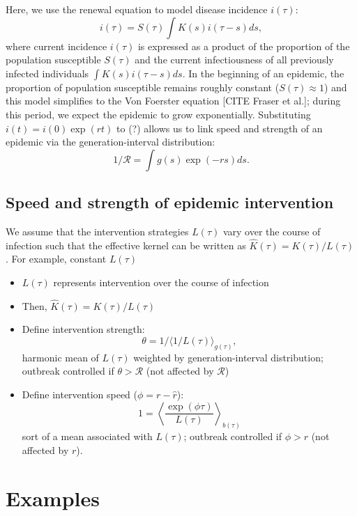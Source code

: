 \documentclass{article}\usepackage[]{graphicx}\usepackage[]{color}
\newcommand{\RR}{\ensuremath{{\mathcal R}}}
\begin{document}
Here, we use the renewal equation to model disease incidence $i(\tau)$:
\begin{equation}
i(\tau) = S(\tau) \int K(s) i(\tau-s) ds,
\end{equation}
where current incidence $i(\tau)$ is expressed as a product of the proportion 
of the population susceptible $S(\tau)$ and the current infectiousness of all 
previously infected individuals $\int K(s) i(\tau - s) ds$. In the beginning 
of an epidemic, the proportion of population susceptible remains roughly 
constant ($S(\tau) \approx 1$) and this model simplifies to the Von Foerster 
equation [CITE Fraser et al.]; during this period, we expect the epidemic 
to grow exponentially. Substituting $i(t) = i(0) \exp(rt)$ to (?) allows us 
to link speed and strength of an epidemic via the generation-interval distribution:
\begin{equation}
1/\RR = \int g(s) \exp(-rs) ds.
\end{equation}

\subsection{Speed and strength of epidemic intervention}

We assume that the intervention strategies $L(\tau)$ vary over the course 
of infection such that the effective kernel can be written as 
$\hat K(\tau) = K(\tau)/L(\tau)$. For example, constant $L(\tau)$


\begin{itemize}
	\item $L(\tau)$ represents intervention over the course of infection
	\item Then, $\hat K(\tau) = K(\tau)/L(\tau)$
	\item Define intervention strength:
	$$
	\theta = 1/\langle 1/L(\tau) \rangle_{g(\tau)},
	$$
	harmonic mean of $L(\tau)$ weighted by generation-interval distribution; outbreak controlled if $\theta > \mathcal R$ (not affected by $\RR$)
	\item Define intervention speed ($\phi = r - \hat r$):
	$$
	1 = \left\langle \frac{\exp(\phi \tau) }{L(\tau)} \right\rangle_{b(\tau)}
	$$
	sort of a mean associated with $L(\tau)$; outbreak controlled if $\phi > r$ (not affected by $r$).
\end{itemize}

\section{Examples}
\end{document}
